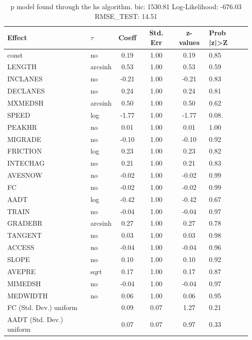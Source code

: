 \begin{table}
	\caption{p model found through the hs algorithm. bic: 1530.81 Log-Likelihood: -676.03 RMSE_TEST: 14.51}
	\begin{center}
		\begin{tabular}{|l|l|c|c|c|l|}
			\hline
			Effect & $\tau$ & Coeff & Std. Err & z-values & Prob |z|>Z \\
			\hline
			const & no & 0.19 & 1.00 & 0.19 & 0.85 \\
			\hline
			LENGTH & arcsinh & 0.53 & 1.00 & 0.53 & 0.59 \\
			\hline
			INCLANES & no & -0.21 & 1.00 & -0.21 & 0.83 \\
			\hline
			DECLANES & no & 0.24 & 1.00 & 0.24 & 0.81 \\
			\hline
			MXMEDSH & arcsinh & 0.50 & 1.00 & 0.50 & 0.62 \\
			\hline
			SPEED & log & -1.77 & 1.00 & -1.77 & 0.08. \\
			\hline
			PEAKHR & no & 0.01 & 1.00 & 0.01 & 1.00 \\
			\hline
			MIGRADE & no & -0.10 & 1.00 & -0.10 & 0.92 \\
			\hline
			FRICTION & log & 0.23 & 1.00 & 0.23 & 0.82 \\
			\hline
			INTECHAG & no & 0.21 & 1.00 & 0.21 & 0.83 \\
			\hline
			AVESNOW & no & -0.02 & 1.00 & -0.02 & 0.99 \\
			\hline
			FC & no & -0.02 & 1.00 & -0.02 & 0.99 \\
			\hline
			AADT & log & -0.42 & 1.00 & -0.42 & 0.67 \\
			\hline
			TRAIN & no & -0.04 & 1.00 & -0.04 & 0.97 \\
			\hline
			GRADEBR & arcsinh & 0.27 & 1.00 & 0.27 & 0.78 \\
			\hline
			TANGENT & no & 0.03 & 1.00 & 0.03 & 0.98 \\
			\hline
			ACCESS & no & -0.04 & 1.00 & -0.04 & 0.96 \\
			\hline
			SLOPE & no & 0.10 & 1.00 & 0.10 & 0.92 \\
			\hline
			AVEPRE & sqrt & 0.17 & 1.00 & 0.17 & 0.87 \\
			\hline
			MIMEDSH & no & -0.04 & 1.00 & -0.04 & 0.97 \\
			\hline
			MEDWIDTH & no & 0.06 & 1.00 & 0.06 & 0.95 \\
			\hline
			FC (Std. Dev.) uniform &  & 0.09 & 0.07 & 1.27 & 0.21 \\
			\hline
			AADT (Std. Dev.) uniform &  & 0.07 & 0.07 & 0.97 & 0.33 \\

\end{tabular}
\end{center}
\end{table}
